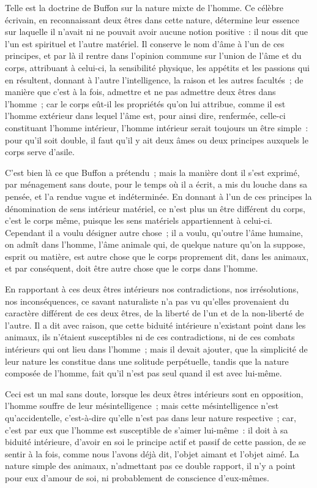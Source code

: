 \documentclass[french,twoside]{book} %
\begin{document}
Telle est la doctrine de Buffon sur la nature mixte de l’homme. Ce célèbre écrivain, en reconnaissant deux êtres dans cette nature, détermine leur essence sur laquelle il n’avait ni ne pouvait avoir aucune notion positive : il nous dit que l’un est spirituel et l’autre matériel. Il conserve le nom d’âme à l’un de ces principes, et par là il rentre dans l’opinion commune sur l’union de l’âme et du corps, attribuant à celui-ci, la sensibilité physique, les appétits et les passions qui en résultent, donnant à l’autre l’intelligence, la raison et les autres facultés ; de manière que c’est à la fois, admettre et ne pas admettre deux êtres dans l’homme ; car le corps eût-il les propriétés qu’on lui attribue, comme il est l’homme extérieur dans lequel l’âme est, pour ainsi dire, renfermée, celle-ci constituant l’homme intérieur, l’homme intérieur serait toujours un être simple : pour qu’il soit double, il faut qu’il y ait deux âmes ou deux principes auxquels le corps serve d’asile.\par
C’est bien là ce que Buffon a prétendu ; mais la manière dont il s’est exprimé, par ménagement sans doute, pour le temps où il a écrit, a mis du louche dans sa pensée, et l’a rendue vague et indéterminée. En donnant à l’un de ces principes la dénomination de sens intérieur matériel, ce n’est plus un être différent du corps, c’est le corps même, puisque les sens matériels appartiennent à celui-ci. Cependant il a voulu désigner autre chose ; il a voulu, qu’outre l’âme humaine, on admît dans l’homme, l’âme animale qui, de quelque nature qu’on la suppose, esprit ou matière, est autre chose que le corps proprement dit, dans les animaux, et par conséquent, doit être autre chose que le corps dans l’homme.\par
En rapportant à ces deux êtres intérieurs nos contradictions, nos irrésolutions, nos inconséquences, ce savant naturaliste n’a pas vu qu’elles provenaient du caractère différent de ces deux êtres, de la liberté de l’un et de la non-liberté de l’autre. Il a dit avec raison, que cette biduité intérieure n’existant point dans les animaux, ils n’étaient susceptibles ni de ces contradictions, ni de ces combats intérieurs qui ont lieu dans l’homme ; mais il devait ajouter, que la simplicité de leur nature les constitue dans une solitude perpétuelle, tandis que la nature composée de l’homme, fait qu’il n’est pas seul quand il est avec lui-même.\par
Ceci est un mal sans doute, lorsque les deux êtres intérieurs sont en opposition, l’homme souffre de leur mésintelligence ; mais cette mésintelligence n’est qu’accidentelle, c’est-à-dire qu’elle n’est pas dans leur nature respective ; car, c’est par eux que l’homme est susceptible de s’aimer lui-même : il doit à sa biduité intérieure, d’avoir en soi le principe actif et passif de cette passion, de se sentir à la fois, comme nous l’avons déjà dit, l’objet aimant et l’objet aimé. La nature simple des animaux, n’admettant pas ce double rapport, il n’y a point pour eux d’amour de soi, ni probablement de conscience d’eux-mêmes.\par
\end{document}
